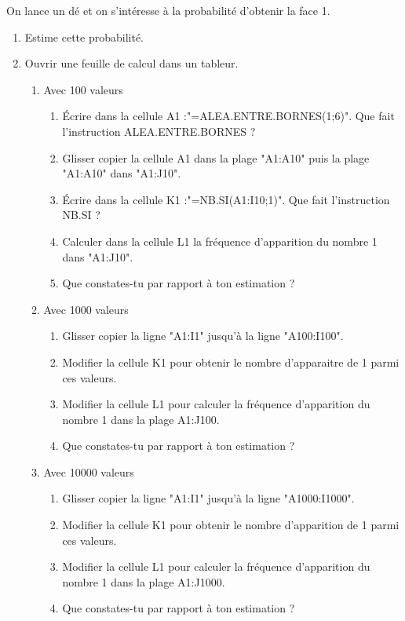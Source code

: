 \begin{pageParcourst}
 On lance un dé et on s'intéresse à la probabilité d'obtenir la face 1.
\begin{enumerate}[leftmargin=*]	
\item Estime cette probabilité.
\item Ouvrir une feuille de calcul dans un tableur.
\begin{enumerate}
\item Avec 100 valeurs
\begin{enumerate}
\item Écrire dans la cellule A1 :"=ALEA.ENTRE.BORNES(1;6)". Que fait l'instruction ALEA.ENTRE.BORNES ?
\item Glisser copier la cellule A1 dans la plage "A1:A10" puis la plage "A1:A10" dans "A1:J10".
\item Écrire dans la cellule K1 :"=NB.SI(A1:I10;1)". Que fait l'instruction NB.SI ?
\item Calculer dans la cellule L1 la fréquence d'apparition du nombre 1 dans "A1:J10".
\item Que constates-tu par rapport à ton estimation ?
\end{enumerate}
\item Avec 1000 valeurs
\begin{enumerate}
\item Glisser copier la ligne "A1:I1" jusqu'à la ligne "A100:I100".
\item Modifier la cellule K1 pour obtenir le nombre d'apparaitre de 1 parmi ces  valeurs.
\item Modifier la cellule L1 pour calculer la fréquence d'apparition du nombre 1 dans la plage A1:J100.
\item Que constates-tu par rapport à ton estimation ?
\end{enumerate}
\item Avec 10000 valeurs
\begin{enumerate}
\item Glisser copier la ligne "A1:I1" jusqu'à la ligne "A1000:I1000".
\item Modifier la cellule K1 pour obtenir le nombre d'apparition de 1 parmi ces  valeurs.
\item Modifier la cellule L1 pour calculer la fréquence d'apparition du nombre 1 dans la plage A1:J1000.
\item Que constates-tu par rapport à ton estimation ?
\end{enumerate}
\end{enumerate}
\end{enumerate}


\end{pageParcourst}
